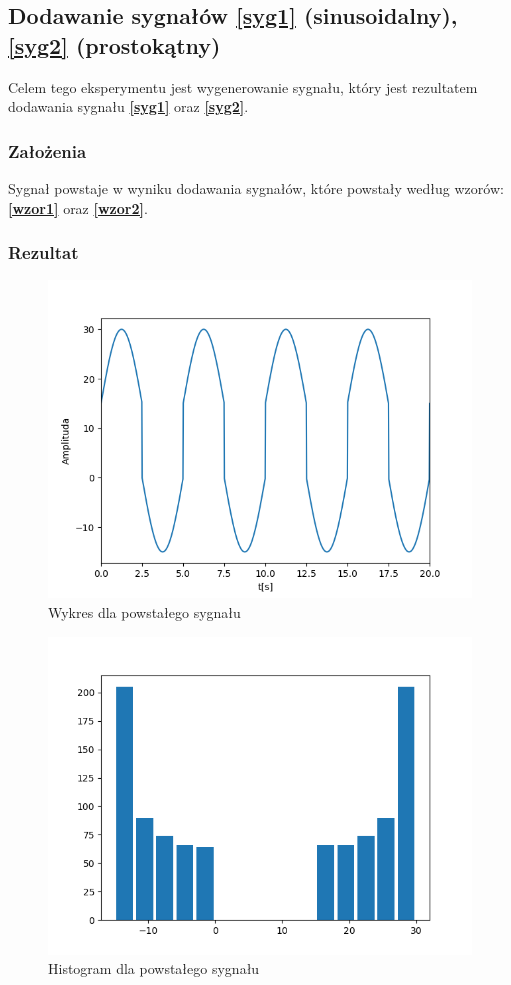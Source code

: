 \documentclass[12pt]{article}
\begin{document}
\subsection{Dodawanie sygnałów \ref{syg1} (sinusoidalny), \ref{syg2} (prostokątny)}
\label{syg5}
Celem tego eksperymentu jest wygenerowanie sygnału, który jest rezultatem dodawania sygnału  \textbf{\ref{syg1}} oraz  \textbf{\ref{syg2}}.
\subsubsection{Założenia}
Sygnał powstaje w wyniku dodawania sygnałów, które powstały według wzorów:  \textbf{\ref{wzor1}} oraz  \textbf{\ref{wzor2}}.
\subsubsection{Rezultat}
\begin{figure}[H]
\centering
\includegraphics[scale=0.8]{dodawanieSinusProstWykres.png}
\caption{Wykres dla powstałego sygnału}
\end{figure}
\begin{figure}[H]
\centering
\includegraphics[scale=0.8]{dodawanieSinusProstHist.png}
\caption{Histogram dla powstałego sygnału}
\end{figure}
\end{document}
